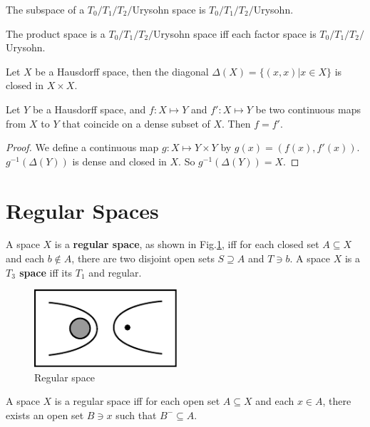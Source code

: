 \documentclass[12pt]{book}
\begin{document}
	\begin{theorem}
		The subspace of a $T_0/T_1/T_2/$Urysohn space is $T_0/T_1/T_2/$Urysohn.
	\end{theorem}
	\begin{theorem}
		The product space is a $T_0/T_1/T_2/$Urysohn space iff each factor space is $T_0/T_1/T_2/$ Urysohn.
	\end{theorem}
	\begin{lemma}
		Let $X$ be a Hausdorff space, then the diagonal $\Delta(X)=\{(x,x)|x\in X\}$ is closed in $X\times X$. 
	\end{lemma}
	\begin{theorem}
		Let $Y$ be a Hausdorff space, and $f:X\mapsto Y$ and $f':X\mapsto Y$ be two continuous maps from $X$ to $Y$ that coincide on a dense subset of $X$. Then $f=f'$.
		\label{thm:Haus_dense}
	\end{theorem}
	\begin{proof}
		We define a continuous map $g: X\mapsto Y\times Y$ by $g(x)=(f(x),f'(x))$. $g^{-1}(\Delta(Y))$ is dense and closed in $X$. So $g^{-1}(\Delta(Y))=X$.
	\end{proof}
\section{Regular Spaces}
	\begin{definition}
		A space $X$ is a {\bf regular space}, as shown in Fig.\ref{fig:regular}, iff for each closed set $A\subseteq X$ and each $b\not \in A$, there are two disjoint open sets $S\supseteq A$ and $T\ni b$. A space $X$ is a {\bf $T_3$ space} iff its $T_1$ and regular.
	\end{definition}
	\begin{figure}[htb!]  
		\centering  
		\includegraphics[width=150pt]{resources/chap_sep_count/regular.pdf}  
		\caption{Regular space}
		\label{fig:regular}
	\end{figure}
	\begin{theorem}
		A space $X$ is a regular space iff for each open set $A\subseteq X$ and each $x \in A$, there exists an open set $B\ni x$ such that $B^-\subseteq A$.
	\end{theorem}
	
\end{document}
